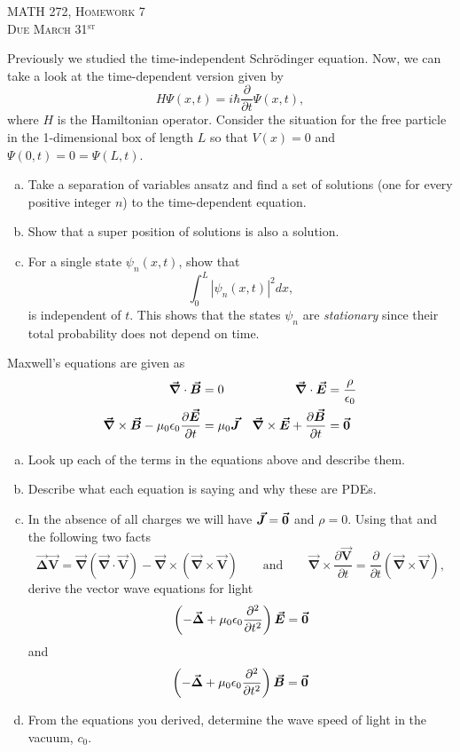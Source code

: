 \documentclass[12pt]{article} %
\newcommand{\grad}{\boldsymbol{\vec{\nabla}}}
\newcommand{\vecfieldE}{\boldsymbol{\vec{E}}}
\newcommand{\vecfieldB}{\boldsymbol{\vec{B}}}
\newcommand{\vecfieldJ}{\boldsymbol{\vec{J}}}
\newcommand{\vecfieldV}{\boldsymbol{\vec{V}}}
\newcommand{\veclaplace}{\boldsymbol{\vec{\Delta}}}
\begin{document}
\begin{center}
   \textsc{\large MATH 272, Homework 7}\\
   \textsc{Due March 31$^\textrm{st}$}
\end{center}
\vspace{.5cm}

\begin{problem}
Previously we studied the time-independent Schr\"odinger equation. Now, we can take a look at the time-dependent version given by
\[
H \Psi(x,t) = i\hbar \frac{\partial}{\partial t} \Psi(x,t),
\]
where $H$ is the Hamiltonian operator.  Consider the situation for the free particle in the 1-dimensional box of length $L$ so that $V(x)=0$ and $\Psi(0,t)=0=\Psi(L,t)$.  
\begin{enumerate}[(a)]
    \item Take a separation of variables ansatz and find a set of solutions (one for every positive integer $n$) to the time-dependent equation.
    \item Show that a super position of solutions is also a solution.
    \item For a single state $\psi_n(x,t)$, show that 
    \[
    \int_0^L \left|\psi_n(x,t)\right|^2 dx,
    \]
    is independent of $t$. This shows that the states $\psi_n$ are \emph{stationary} since their total probability does not depend on time.
\end{enumerate}
\end{problem}


\begin{problem}
Maxwell's equations are given as
\begin{align*}
\grad \cdot \vecfieldB &= 0  & \grad \cdot \vecfieldE &= \frac{\rho}{\epsilon_0}\\
\grad \times \vecfieldB -\mu_0 \epsilon_0\frac{\partial \vecfieldE}{\partial t}&=\mu_0 \vecfieldJ & \grad \times \vecfieldE + \frac{\partial \vecfieldB}{\partial t} &= \zerovec
\end{align*}
\begin{enumerate}[(a)]
    \item Look up each of the terms in the equations above and describe them.
    \item Describe what each equation is saying and why these are PDEs.
    \item In the absence of all charges we will have $\vecfieldJ=\zerovec$ and $\rho=0$.  Using that and the following two facts
    \[
    \veclaplace \vecfieldV = \grad (\grad \cdot \vecfieldV) - \grad \times (\grad \times \vecfieldV) \qquad \textrm{and} \qquad \grad \times \frac{\partial \vecfieldV}{\partial t} = \frac{\partial}{\partial t} (\grad \times \vecfieldV),
    \]
    derive the vector wave equations for light
    \[
    \left( - \veclaplace + \mu_0 \epsilon_0 \frac{\partial^2 }{\partial t^2}\right) \vecfieldE = \zerovec
    \]
    and
    \[
    \left( - \veclaplace + \mu_0 \epsilon_0 \frac{\partial^2 }{\partial t^2}\right) \vecfieldB = \zerovec
    \]
    \item From the equations you derived, determine the wave speed of light in the vacuum, $c_0$.
\end{enumerate}
\end{problem}
\end{document}
